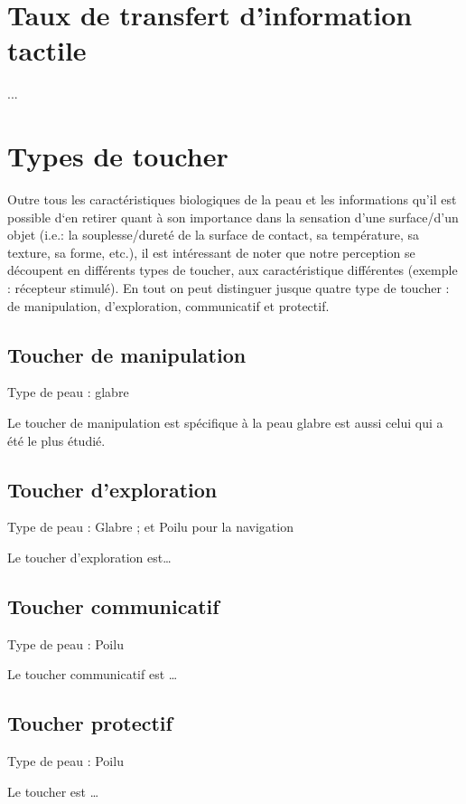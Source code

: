 \section{Taux de transfert d’information tactile}
...

\section{Types de toucher}
Outre tous les caractéristiques biologiques de la peau et les informations qu’il est possible d‘en retirer quant à son importance dans la sensation d’une surface/d’un objet (i.e.: la souplesse/dureté de la surface de contact, sa température, sa texture, sa forme, etc.), il est intéressant de noter que notre perception se découpent en différents types de toucher, aux caractéristique différentes (exemple : récepteur stimulé). En tout on peut distinguer jusque quatre type de toucher : de manipulation, d’exploration, communicatif et protectif.\par

\subsection{Toucher de manipulation}
Type de peau : glabre\par

Le toucher de manipulation est spécifique à la peau glabre est aussi celui qui a été le plus étudié.

\subsection{Toucher d’exploration}
Type de peau : Glabre ; et Poilu pour la navigation\par
Le toucher d’exploration est…

\subsection{Toucher communicatif}
Type de peau : Poilu\par
Le toucher communicatif est …

\subsection{Toucher protectif}
Type de peau : Poilu\par
Le toucher est …




